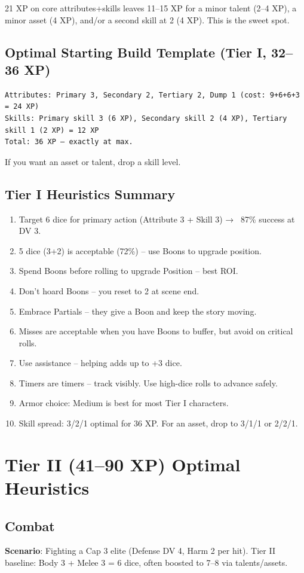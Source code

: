 \documentclass[11pt]{article}
\begin{document}
21 XP on core attributes+skills leaves 11–15 XP for a minor talent (2–4 XP), a minor asset (4 XP), and/or a second skill at 2 (4 XP). This is the sweet spot.

\subsection{Optimal Starting Build Template (Tier I, 32–36 XP)}
\begin{verbatim}
Attributes: Primary 3, Secondary 2, Tertiary 2, Dump 1 (cost: 9+6+6+3 = 24 XP)
Skills: Primary skill 3 (6 XP), Secondary skill 2 (4 XP), Tertiary skill 1 (2 XP) = 12 XP
Total: 36 XP – exactly at max.
\end{verbatim}
If you want an asset or talent, drop a skill level.

\subsection{Tier I Heuristics Summary}
\begin{enumerate}
    \item Target 6 dice for primary action (Attribute 3 + Skill 3) → ~87\% success at DV 3.
    \item 5 dice (3+2) is acceptable (72\%) – use Boons to upgrade position.
    \item Spend Boons before rolling to upgrade Position – best ROI.
    \item Don't hoard Boons – you reset to 2 at scene end.
    \item Embrace Partials – they give a Boon and keep the story moving.
    \item Misses are acceptable when you have Boons to buffer, but avoid on critical rolls.
    \item Use assistance – helping adds up to +3 dice.
    \item Timers are timers – track visibly. Use high-dice rolls to advance safely.
    \item Armor choice: Medium is best for most Tier I characters.
    \item Skill spread: 3/2/1 optimal for 36 XP. For an asset, drop to 3/1/1 or 2/2/1.
\end{enumerate}

\section{Tier II (41–90 XP) Optimal Heuristics}

\subsection{Combat}
\textbf{Scenario}: Fighting a Cap 3 elite (Defense DV 4, Harm 2 per hit). Tier II baseline: Body 3 + Melee 3 = 6 dice, often boosted to 7–8 via talents/assets.
\end{document}
